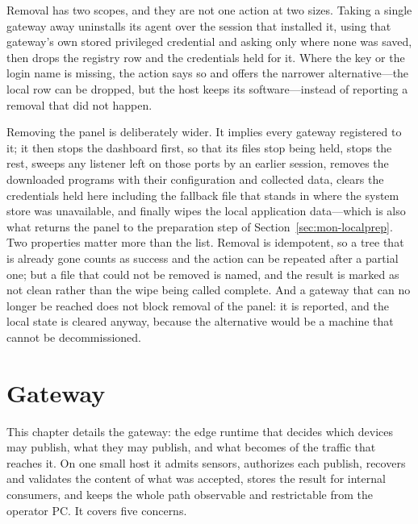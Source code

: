 \documentclass[12pt,a4paper]{report}
\begin{document}
Removal has two scopes, and they are not one action at two sizes.
Taking a single gateway away uninstalls its agent over the session that
installed it, using that gateway's own stored privileged credential and
asking only where none was saved, then drops the registry row and the
credentials held for it. Where the key or the login name is missing, the
action says so and offers the narrower alternative---the local row can
be dropped, but the host keeps its software---instead of reporting a
removal that did not happen.

Removing the panel is deliberately wider. It implies every gateway
registered to it; it then stops the dashboard first, so that its files
stop being held, stops the rest, sweeps any listener left on those
ports by an earlier session, removes the downloaded programs with their
configuration and collected data, clears the credentials held here
including the fallback file that stands in where the system store was
unavailable, and finally wipes the local application data---which is
also what returns the panel to the preparation step of
Section~\ref{sec:mon-localprep}. Two properties matter more than the
list. Removal is idempotent, so a tree that is already gone counts as
success and the action can be repeated after a partial one; but a file
that could not be removed is named, and the result is marked as not
clean rather than the wipe being called complete. And a gateway that can
no longer be reached does not block removal of the panel: it is
reported, and the local state is cleared anyway, because the alternative
would be a machine that cannot be decommissioned.

\chapter{Gateway}
\label{ch:gateway}


This chapter details the gateway: the edge runtime that decides
which devices may publish, what they may publish, and what becomes
of the traffic that reaches it. On one small host it admits
sensors, authorizes each publish, recovers and validates the
content of what was accepted, stores the result for internal
consumers, and keeps the whole path observable and restrictable
from the operator PC. It covers five concerns.
\end{document}
